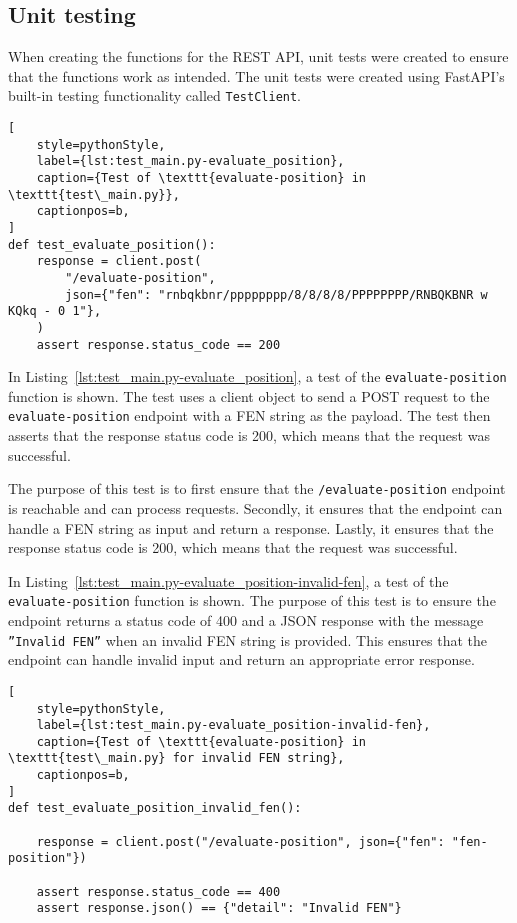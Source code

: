 \subsection{Unit testing}\label{subsec:unit-testing}
When creating the functions for the REST API, unit tests were created to ensure that the functions work as intended.
The unit tests were created using FastAPI's built-in testing functionality called \texttt{TestClient}.

\begin{lstlisting}[
    style=pythonStyle,
    label={lst:test_main.py-evaluate_position},
    caption={Test of \texttt{evaluate-position} in \texttt{test\_main.py}},
    captionpos=b,
]
def test_evaluate_position():
    response = client.post(
        "/evaluate-position",
        json={"fen": "rnbqkbnr/pppppppp/8/8/8/8/PPPPPPPP/RNBQKBNR w KQkq - 0 1"},
    )
    assert response.status_code == 200
\end{lstlisting}

In Listing~\ref{lst:test_main.py-evaluate_position}, a test of the \texttt{evaluate-position} function is shown.
The test uses a client object to send a POST request to the \texttt{evaluate-position} endpoint with a FEN string as
the payload.
The test then asserts that the response status code is 200, which means that the request was successful.

The purpose of this test is to first ensure that the \texttt{/evaluate-position} endpoint is reachable and can process
requests.
Secondly, it ensures that the endpoint can handle a FEN string as input and return a response.
Lastly, it ensures that the response status code is 200, which means that the request was successful.

In Listing~\ref{lst:test_main.py-evaluate_position-invalid-fen}, a test of the \texttt{evaluate-position} function is
shown.
The purpose of this test is to ensure the endpoint returns a status code of 400 and a JSON response with the
message \texttt{''Invalid FEN''} when an invalid FEN string is provided.
This ensures that the endpoint can handle invalid input and return an appropriate error response.

\begin{lstlisting}[
    style=pythonStyle,
    label={lst:test_main.py-evaluate_position-invalid-fen},
    caption={Test of \texttt{evaluate-position} in \texttt{test\_main.py} for invalid FEN string},
    captionpos=b,
]
def test_evaluate_position_invalid_fen():

    response = client.post("/evaluate-position", json={"fen": "fen-position"})

    assert response.status_code == 400
    assert response.json() == {"detail": "Invalid FEN"}
\end{lstlisting}
